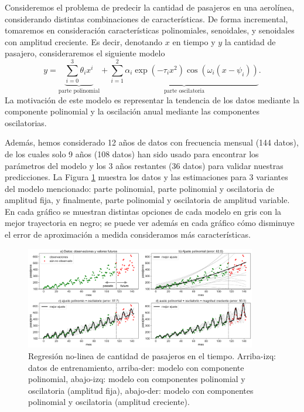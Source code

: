 \begin{mdframed}[style=ejemplo, frametitle={\center Ejemplo: Predicción de pasajeros de una aerolínea)}]

Consideremos el problema de predecir la cantidad de pasajeros en una aerolínea, considerando  distintas combinaciones de características. De forma incremental, tomaremos en consideración características polinomiales,  senoidales, y senoidales con amplitud creciente. Es decir, denotando $x$ en tiempo y $y$  la cantidad de pasajero, consideraremos el siguiente modelo
\begin{equation}
    y = \underbrace{\sum_{i=0}^3 \theta_i x^i}_\text{parte polinomial} + \underbrace{ \sum_{i=1}^2 \alpha_i\exp(-\tau_ix^2)\cos(\omega_i(x-\psi_i))}_\text{parte oscilatoria}.
\end{equation}
La motivación de este modelo es representar la tendencia de los datos mediante la componente polinomial y la oscilación anual mediante las componentes oscilatorias.

Además, hemos considerado 12 años de datos con frecuencia mensual (144 datos), de los cuales solo 9 años (108 datos) han sido usado para encontrar los parámetros del modelo y los  3 años restantes (36 datos) para validar nuestras predicciones. La Figura \ref{fig:pasajeros} muestra los datos y las estimaciones para 3 variantes del modelo mencionado: parte polinomial, parte polinomial y oscilatoria de amplitud fija, y finalmente,  parte polinomial y oscilatoria de amplitud variable. En cada gráfico se muestran distintas opciones de cada  modelo en gris con la mejor  trayectoria en negro; se puede ver además en cada gráfico cómo disminuye el error de aproximación a medida consideramos más características. 


\begin{figure}[H]
    \centering
    \includegraphics[width=0.9\textwidth, frame]{img/cap1_pasajeros.pdf}
    \caption{Regresión no-linea de cantidad de pasajeros en el tiempo. Arriba-izq: datos de entrenamiento, arriba-der: modelo con componente polinomial, abajo-izq: modelo con componentes polinomial y oscilatoria (amplitud fija), abajo-der: modelo con componentes polinomial y oscilatoria (amplitud creciente).}
    \label{fig:pasajeros}  
\end{figure}
\end{mdframed}




